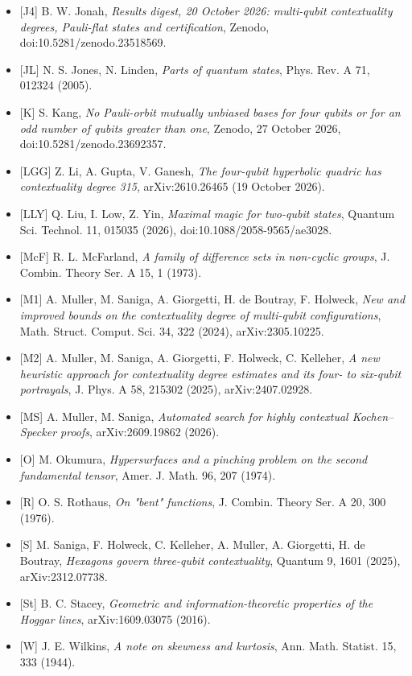 \documentclass[11pt,a4paper]{article}
\begin{document}
\begin{itemize}
  {[}J3{]} B. W. Jonah, \emph{The reach of the section-square law: hyperplane completions of symplectic and quadric Pauli configurations}, preprint v0.5, manuscript dated 20 October 2026, deposited 21 October 2026. Section 2, Theorems A and B2--B4, Lemma D, Remark 2, Corollary 3, Table 1 and Section 6, Conjecture E. \href{https://zenodo.org/records/23524332}{Primary deposit}, \href{https://doi.org/10.5281/zenodo.23524332}{doi:10.5281/zenodo.23524332}.
\item
  {[}J4{]} B. W. Jonah, \emph{Results digest, 20 October 2026: multi-qubit contextuality degrees, Pauli-flat states and certification}, Zenodo, doi:10.5281/zenodo.23518569.
\item
  {[}JL{]} N. S. Jones, N. Linden, \emph{Parts of quantum states}, Phys. Rev. A 71, 012324 (2005).
\item
  {[}K{]} S. Kang, \emph{No Pauli-orbit mutually unbiased bases for four qubits or for an odd number of qubits greater than one}, Zenodo, 27 October 2026, doi:10.5281/zenodo.23692357.
\item
  {[}LGG{]} Z. Li, A. Gupta, V. Ganesh, \emph{The four-qubit hyperbolic quadric has contextuality degree 315}, arXiv:2610.26465 (19 October 2026).
\item
  {[}LLY{]} Q. Liu, I. Low, Z. Yin, \emph{Maximal magic for two-qubit states}, Quantum Sci. Technol. 11, 015035 (2026), doi:10.1088/2058-9565/ae3028.
\item
  {[}McF{]} R. L. McFarland, \emph{A family of difference sets in non-cyclic groups}, J. Combin. Theory Ser. A 15, 1 (1973).
\item
  {[}M1{]} A. Muller, M. Saniga, A. Giorgetti, H. de Boutray, F. Holweck, \emph{New and improved bounds on the contextuality degree of multi-qubit configurations}, Math. Struct. Comput. Sci. 34, 322 (2024), arXiv:2305.10225.
\item
  {[}M2{]} A. Muller, M. Saniga, A. Giorgetti, F. Holweck, C. Kelleher, \emph{A new heuristic approach for contextuality degree estimates and its four- to six-qubit portrayals}, J. Phys. A 58, 215302 (2025), arXiv:2407.02928.
\item
  {[}MS{]} A. Muller, M. Saniga, \emph{Automated search for highly contextual Kochen--Specker proofs}, arXiv:2609.19862 (2026).
\item
  {[}O{]} M. Okumura, \emph{Hypersurfaces and a pinching problem on the second fundamental tensor}, Amer. J. Math. 96, 207 (1974).
\item
  {[}R{]} O. S. Rothaus, \emph{On "bent" functions}, J. Combin. Theory Ser. A 20, 300 (1976).
\item
  {[}S{]} M. Saniga, F. Holweck, C. Kelleher, A. Muller, A. Giorgetti, H. de Boutray, \emph{Hexagons govern three-qubit contextuality}, Quantum 9, 1601 (2025), arXiv:2312.07738.
\item
  {[}St{]} B. C. Stacey, \emph{Geometric and information-theoretic properties of the Hoggar lines}, arXiv:1609.03075 (2016).
\item
  {[}W{]} J. E. Wilkins, \emph{A note on skewness and kurtosis}, Ann. Math. Statist. 15, 333 (1944).
\end{itemize}
\end{document}
